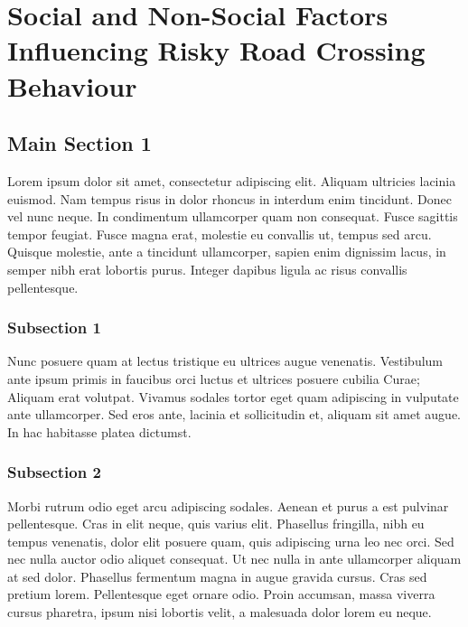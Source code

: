 
\chapter{Social and Non-Social Factors Influencing Risky Road Crossing Behaviour} %

\label{Chapter6} %



\section{Main Section 1}

Lorem ipsum dolor sit amet, consectetur adipiscing elit. Aliquam ultricies lacinia euismod. Nam tempus risus in dolor rhoncus in interdum enim tincidunt. Donec vel nunc neque. In condimentum ullamcorper quam non consequat. Fusce sagittis tempor feugiat. Fusce magna erat, molestie eu convallis ut, tempus sed arcu. Quisque molestie, ante a tincidunt ullamcorper, sapien enim dignissim lacus, in semper nibh erat lobortis purus. Integer dapibus ligula ac risus convallis pellentesque.

\subsection{Subsection 1}

Nunc posuere quam at lectus tristique eu ultrices augue venenatis. Vestibulum ante ipsum primis in faucibus orci luctus et ultrices posuere cubilia Curae; Aliquam erat volutpat. Vivamus sodales tortor eget quam adipiscing in vulputate ante ullamcorper. Sed eros ante, lacinia et sollicitudin et, aliquam sit amet augue. In hac habitasse platea dictumst.


\subsection{Subsection 2}
Morbi rutrum odio eget arcu adipiscing sodales. Aenean et purus a est pulvinar pellentesque. Cras in elit neque, quis varius elit. Phasellus fringilla, nibh eu tempus venenatis, dolor elit posuere quam, quis adipiscing urna leo nec orci. Sed nec nulla auctor odio aliquet consequat. Ut nec nulla in ante ullamcorper aliquam at sed dolor. Phasellus fermentum magna in augue gravida cursus. Cras sed pretium lorem. Pellentesque eget ornare odio. Proin accumsan, massa viverra cursus pharetra, ipsum nisi lobortis velit, a malesuada dolor lorem eu neque.

